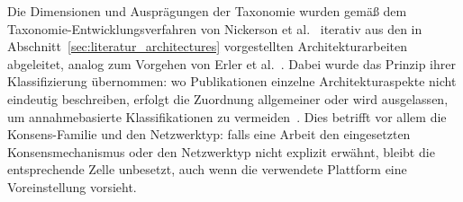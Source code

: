 Die Dimensionen und Ausprägungen der Taxonomie wurden gemäß dem Taxonomie-Entwicklungsverfahren von Nickerson et al.~\cite{nickerson2013} iterativ aus den in Abschnitt~\ref{sec:literatur_architectures} vorgestellten Architekturarbeiten abgeleitet, analog zum Vorgehen von Erler et al.~\cite{erler2024}. Dabei wurde das Prinzip ihrer Klassifizierung übernommen: wo Publikationen einzelne Architekturaspekte nicht eindeutig beschreiben, erfolgt die Zuordnung allgemeiner oder wird ausgelassen, um annahmebasierte Klassifikationen zu vermeiden~\cite{erler2024}. Dies betrifft vor allem die Konsens-Familie und den Netzwerktyp: falls eine Arbeit den eingesetzten Konsensmechanismus oder den Netzwerktyp nicht explizit erwähnt, bleibt die entsprechende Zelle unbesetzt, auch wenn die verwendete Plattform eine Voreinstellung vorsieht.


